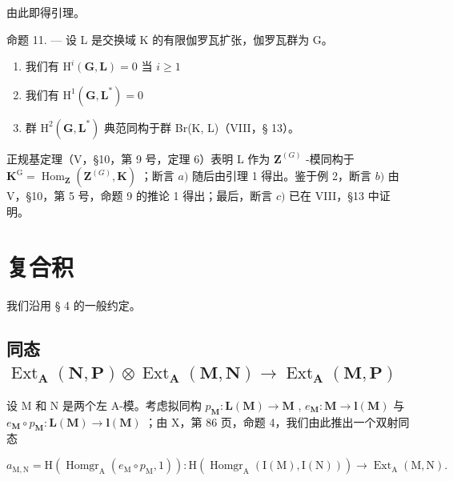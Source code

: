 由此即得引理。

命题 11. --- 设 L 是交换域 K 的有限伽罗瓦扩张，伽罗瓦群为 G。

\begin{enumerate}
\def\labelenumi{\alph{enumi})}
\item
  我们有 \(\mathrm{H}^i (\mathbf{G},\mathbf{L}) = 0\) 当 \(i\geqslant 1\)
\item
  我们有 \(\mathrm{H}^1 (\mathbf{G},\mathbf{L}^*) = 0\)
\item
  群 \(\mathrm{H}^2 (\mathbf{G},\mathbf{L}^*)\) 典范同构于群 Br(K, L)（VIII，§ 13）。
\end{enumerate}

正规基定理（V，§10，第 9 号，定理 6）表明 L 作为 \(\mathbf{Z}^{(G)}\) -模同构于 \(\mathbf{K}^{\mathrm{G}} = \operatorname{Hom}_{\mathbf{Z}}(\mathbf{Z}^{(G)}, \mathbf{K})\) ；断言 \(a)\) 随后由引理 1 得出。鉴于例 2，断言 \(b)\) 由 V，§10，第 5 号，命题 9 的推论 1 得出；最后，断言 \(c)\) 已在 VIII，§13 中证明。

\section{复合积}

我们沿用 § 4 的一般约定。

\subsection{\texorpdfstring{同态 \(\operatorname{Ext}_{\mathbf{A}}(\mathbf{N}, \mathbf{P}) \otimes \operatorname{Ext}_{\mathbf{A}}(\mathbf{M}, \mathbf{N}) \to \operatorname{Ext}_{\mathbf{A}}(\mathbf{M}, \mathbf{P})\)}{同态 \textbackslash operatorname\{Ext\}\_\{\textbackslash mathbf\{A\}\}(\textbackslash mathbf\{N\}, \textbackslash mathbf\{P\}) \textbackslash otimes \textbackslash operatorname\{Ext\}\_\{\textbackslash mathbf\{A\}\}(\textbackslash mathbf\{M\}, \textbackslash mathbf\{N\}) \textbackslash 到 \textbackslash operatorname\{Ext\}\_\{\textbackslash mathbf\{A\}\}(\textbackslash mathbf\{M\}, \textbackslash mathbf\{P\})}}

设 M 和 N 是两个左 A-模。考虑拟同构 \(p_{\mathbf{M}}: \mathbf{L}(\mathbf{M}) \to \mathbf{M}\) , \(e_{\mathbf{M}}: \mathbf{M} \to \mathbf{l}(\mathbf{M})\) 与 \(e_{\mathbf{M}} \circ p_{\mathbf{M}}: \mathbf{L}(\mathbf{M}) \to \mathbf{l}(\mathbf{M})\) ；由 X，第 86 页，命题 4，我们由此推出一个双射同态

\[
a _ {\mathrm{M}, \mathrm{N}} = \mathrm{H} (\operatorname{Homgr} _ {\mathrm{A}} (e _ {\mathrm{M}} \circ p _ {\mathrm{M}}, 1)): \mathrm{H} (\operatorname{Homgr} _ {\mathrm{A}} (\mathrm{I} (\mathrm{M}), \mathrm{I} (\mathrm{N}))) \rightarrow \operatorname{Ext} _ {\mathrm{A}} (\mathrm{M}, \mathrm{N}).
\]

